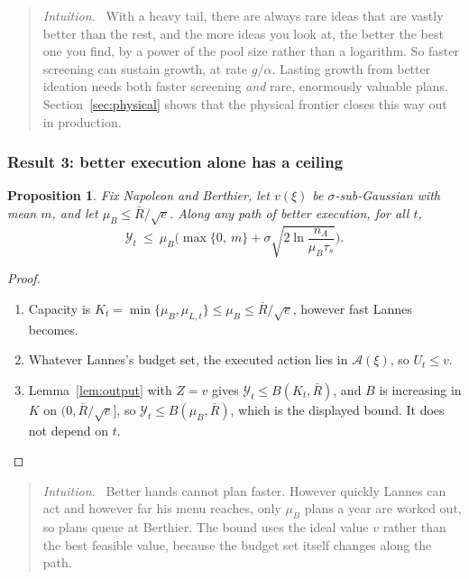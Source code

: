 \documentclass[11pt]{article}
\newcommand{\Nap}{\textcolor{nap}{Napoleon}}
\newcommand{\Ber}{\textcolor{ber}{Berthier}}
\newcommand{\Lan}{\textcolor{lan}{Lannes}}
\newtheorem{proposition}{Proposition}
\theoremstyle{remark}
\newenvironment{intuition}{\begin{quote}\small\color{muted}\textit{Intuition.}\ }{\end{quote}}
\newcommand{\Ycal}{\mathcal{Y}}
\newcommand{\Acal}{\mathcal{A}}
\begin{document}
\begin{intuition}
With a heavy tail, there are always rare ideas that are vastly better than the rest, and the more ideas you look at, the better the best one you find, by a power of the pool size rather than a logarithm. So faster screening can sustain growth, at rate $g/\alpha$. Lasting growth from better ideation needs both faster screening \emph{and} rare, enormously valuable plans. Section~\ref{sec:physical} shows that the physical frontier closes this way out in production.
\end{intuition}

\subsubsection*{Result 3: better execution alone has a ceiling}

\begin{proposition}\label{prop:execution}
Fix \Nap{} and \Ber, let $v(\xi)$ be $\sigma$-sub-Gaussian with mean $m$, and let $\mu_B\le\bar R/\sqrt e$. Along any path of better execution, for all $t$,
\[
\Ycal_t\ \le\ \mu_B\bigg(\max\big\{0,\ m\big\}+\sigma\sqrt{2\ln\frac{n_A}{\mu_B\tau_s}}\bigg).
\]
\end{proposition}

\begin{proof}
\begin{enumerate}
  \item Capacity is $K_t=\min\{\mu_B,\mu_{L,t}\}\le\mu_B\le\bar R/\sqrt e$, however fast \Lan{} becomes.
  \item Whatever \Lan's budget set, the executed action lies in $\Acal(\xi)$, so $U_t\le v$.
  \item Lemma~\ref{lem:output} with $Z=v$ gives $\Ycal_t\le B(K_t,\bar R)$, and $B$ is increasing in $K$ on $(0,\bar R/\sqrt e]$, so $\Ycal_t\le B(\mu_B,\bar R)$, which is the displayed bound. It does not depend on $t$. \qedhere
\end{enumerate}
\end{proof}

\begin{intuition}
Better hands cannot plan faster. However quickly \Lan{} can act and however far his menu reaches, only $\mu_B$ plans a year are worked out, so plans queue at \Ber. The bound uses the ideal value $v$ rather than the best feasible value, because the budget set itself changes along the path.
\end{intuition}
\end{document}
